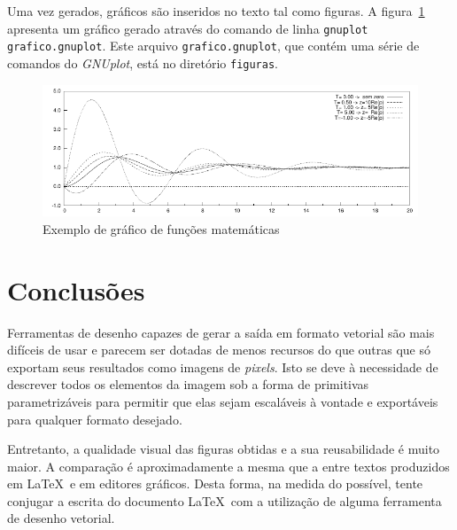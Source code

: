 Uma vez gerados, gráficos são inseridos no texto tal como figuras. A
figura~\ref{fig:grafico} apresenta um gráfico gerado através do
comando de linha \texttt{gnuplot grafico.gnuplot}. Este arquivo
\texttt{grafico.gnuplot}, que contém uma série de comandos do
\textit{GNUplot}, está no diretório \texttt{figuras}.

\begin{figure}[htbp]
\centering
\includegraphics{textuais/04-problema/figuras/grafico}
\caption{Exemplo de gráfico de funções matemáticas}
\label{fig:grafico}
\end{figure}

\section{Conclusões}

Ferramentas de desenho capazes de gerar a saída em formato vetorial
são mais difíceis de usar e parecem ser dotadas de menos recursos do
que outras que só exportam seus resultados como imagens de
\emph{pixels}.  Isto se deve à necessidade de descrever todos os
elementos da imagem sob a forma de primitivas parametrizáveis para
permitir que elas sejam escaláveis à vontade e exportáveis para
qualquer formato desejado.

Entretanto, a qualidade visual das figuras obtidas e a sua
reusabilidade é muito maior. A comparação é aproximadamente a mesma
que a entre textos produzidos em \LaTeX\ e em editores gráficos. Desta
forma, na medida do possível, tente conjugar a escrita do documento
\LaTeX\ com a utilização de alguma ferramenta de desenho vetorial.

